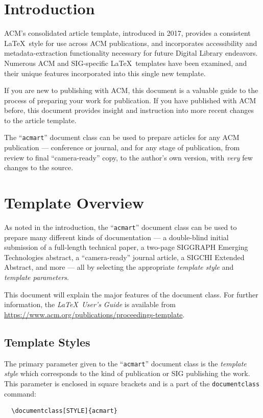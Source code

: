 \documentclass[acmsmall]{acmart}
\begin{document}
\section{Introduction}
ACM's consolidated article template, introduced in 2017, provides a
consistent \LaTeX\ style for use across ACM publications, and
incorporates accessibility and metadata-extraction functionality
necessary for future Digital Library endeavors. Numerous ACM and
SIG-specific \LaTeX\ templates have been examined, and their unique
features incorporated into this single new template.

If you are new to publishing with ACM, this document is a valuable
guide to the process of preparing your work for publication. If you
have published with ACM before, this document provides insight and
instruction into more recent changes to the article template.

The ``\verb|acmart|'' document class can be used to prepare articles
for any ACM publication --- conference or journal, and for any stage
of publication, from review to final ``camera-ready'' copy, to the
author's own version, with {\itshape very} few changes to the source.

\section{Template Overview}
As noted in the introduction, the ``\verb|acmart|'' document class can
be used to prepare many different kinds of documentation --- a
double-blind initial submission of a full-length technical paper, a
two-page SIGGRAPH Emerging Technologies abstract, a ``camera-ready''
journal article, a SIGCHI Extended Abstract, and more --- all by
selecting the appropriate {\itshape template style} and {\itshape
  template parameters}.

This document will explain the major features of the document
class. For further information, the {\itshape \LaTeX\ User's Guide} is
available from
\url{https://www.acm.org/publications/proceedings-template}.

\subsection{Template Styles}

The primary parameter given to the ``\verb|acmart|'' document class is
the {\itshape template style} which corresponds to the kind of publication
or SIG publishing the work. This parameter is enclosed in square
brackets and is a part of the {\verb|documentclass|} command:
\begin{verbatim}
  \documentclass[STYLE]{acmart}
\end{verbatim}
\end{document}
